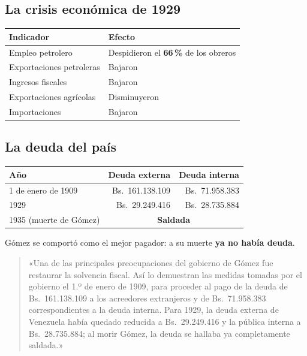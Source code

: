 \documentclass[12pt, letterpaper]{article}
\begin{document}
\subsection*{La crisis económica de 1929}
\begin{center}
\small
\begin{tabularx}{0.85\linewidth}{@{}X l@{}}
  \toprule
  \textbf{Indicador} & \textbf{Efecto} \\
  \midrule
  Empleo petrolero             & Despidieron el \textbf{66\,\%} de los obreros \\
  Exportaciones petroleras     & Bajaron \\
  Ingresos fiscales            & Bajaron \\
  Exportaciones agrícolas      & Disminuyeron \\
  Importaciones                & Bajaron \\
  \bottomrule
\end{tabularx}
\end{center}

\subsection*{La deuda del país}
\begin{center}
\small
\begin{tabular}{@{}l r r@{}}
  \toprule
  \textbf{Año} & \textbf{Deuda externa} & \textbf{Deuda interna} \\
  \midrule
  1 de enero de 1909       & Bs.\ 161.138.109 & Bs.\ 71.958.383 \\
  1929                     & Bs.\ 29.249.416  & Bs.\ 28.735.884 \\
  1935 (muerte de Gómez)   & \multicolumn{2}{c}{\textbf{Saldada}} \\
  \bottomrule
\end{tabular}
\end{center}

\noindent Gómez se comportó como \guillemotleft el mejor pagador\guillemotright:
a su muerte \textbf{ya no había deuda}.

\begin{quote}
\small
«Una de las principales preocupaciones del gobierno de Gómez fue restaurar la
solvencia fiscal. Así lo demuestran las medidas tomadas por el gobierno el
1.º de enero de 1909, para proceder al pago de la deuda de Bs.\ 161.138.109 a
los acreedores extranjeros y de Bs.\ 71.958.383 correspondientes a la deuda
interna. Para 1929, la deuda externa de Venezuela había quedado reducida a
Bs.\ 29.249.416 y la pública interna a Bs.\ 28.735.884; al morir Gómez, la
deuda se hallaba ya completamente saldada.»
\end{quote}
\end{document}
